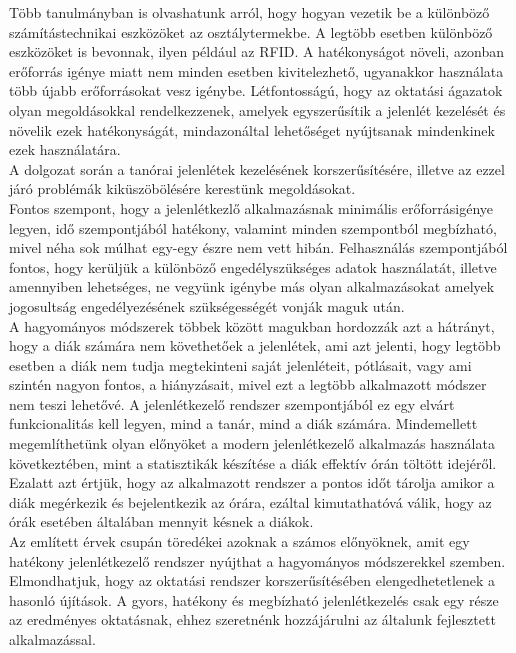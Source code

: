 \documentclass[12pt]{article}
\numberwithin{figure}{section}
\numberwithin{equation}{section}
\begin{document}
Több tanulmányban is olvashatunk arról, hogy hogyan vezetik be a különböző számítástechnikai eszközöket az osztálytermekbe. A legtöbb esetben különböző eszközöket is bevonnak, ilyen például az RFID. A hatékonyságot növeli, azonban erőforrás igénye miatt nem minden esetben kivitelezhető, ugyanakkor használata több újabb erőforrásokat vesz igénybe.
Létfontosságú, hogy az oktatási ágazatok olyan megoldásokkal rendelkezzenek, amelyek egyszerűsítik a jelenlét kezelését és növelik ezek hatékonyságát, mindazonáltal lehetőséget nyújtsanak mindenkinek ezek használatára.\\
A dolgozat során a tanórai jelenlétek kezelésének korszerűsítésére, illetve az ezzel járó problémák kiküszöbölésére kerestünk megoldásokat.\\
Fontos szempont, hogy a jelenlétkezlő alkalmazásnak minimális erőforrásigénye legyen, idő szempontjából hatékony, valamint minden szempontból megbízható, mivel néha sok múlhat egy-egy észre nem vett hibán. Felhasználás szempontjából fontos, hogy kerüljük a különböző engedélyszükséges adatok használatát, illetve amennyiben lehetséges, ne vegyünk igénybe más olyan alkalmazásokat amelyek jogosultság engedélyezésének szükségességét vonják maguk után. \\ 
A hagyományos módszerek többek között magukban hordozzák azt a hátrányt, hogy a diák számára nem követhetőek a jelenlétek, ami azt jelenti, hogy legtöbb esetben a diák nem tudja megtekinteni saját jelenléteit, pótlásait, vagy ami szintén nagyon fontos, a hiányzásait, mivel ezt a legtöbb alkalmazott módszer nem teszi lehetővé. A jelenlétkezelő rendszer szempontjából ez egy elvárt funkcionalitás kell legyen, mind a tanár, mind a diák számára. Mindemellett megemlíthetünk olyan előnyöket a modern jelenlétkezelő alkalmazás használata következtében, mint a statisztikák készítése a diák effektív órán töltött idejéről. Ezalatt azt értjük, hogy az alkalmazott rendszer a pontos időt tárolja amikor a diák megérkezik és bejelentkezik az órára, ezáltal kimutathatóvá válik, hogy az órák esetében általában mennyit késnek a diákok.\\
Az említett érvek csupán töredékei azoknak a számos előnyöknek, amit egy hatékony jelenlétkezelő rendszer nyújthat a hagyományos módszerekkel szemben.\\
Elmondhatjuk, hogy az oktatási rendszer korszerűsítésében elengedhetetlenek a hasonló újítások. A gyors, hatékony és megbízható jelenlétkezelés csak egy része az eredményes oktatásnak, ehhez szeretnénk hozzájárulni az általunk fejlesztett alkalmazással.
\end{document}
